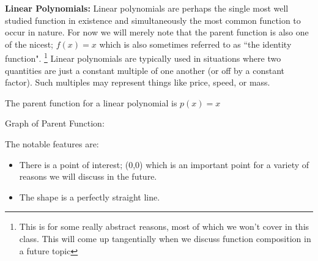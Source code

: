 \documentclass{ximeraXloud}
\begin{document}
        \textbf{Linear Polynomials:} Linear polynomials are perhaps the single most well studied function in existence and simultaneously the most common function to occur in nature. For now we will merely note that the parent function is also one of the nicest; $f(x) = x$ which is also sometimes referred to as ``the identity function".%
        \footnote{
            This is for some really abstract reasons, most of which we won't cover in this class. This will come up tangentially when we discuss function composition in a future topic
            }
        Linear polynomials are typically used in situations where two quantities are just a constant multiple of one another (or off by a constant factor). Such multiples may represent things like price, speed, or mass.
        \begin{description}
            \item[Parent Function:] The parent function for a linear polynomial is $p(x) = x$
            
            \begin{minipage}{\textwidth}\item[Graph of Parent Function:]\hspace*{0pt} \\
                \begin{center}
                \end{center}
            \end{minipage}
            
            \item[Notable Features of Graph:] The notable features are:
            \begin{itemize}
                \item There is a point of interest; (0,0) which is an important point for a variety of reasons we will discuss in the future. 
                \item The shape is a perfectly straight line.
            \end{itemize}
            

\end{description}
\end{document}
